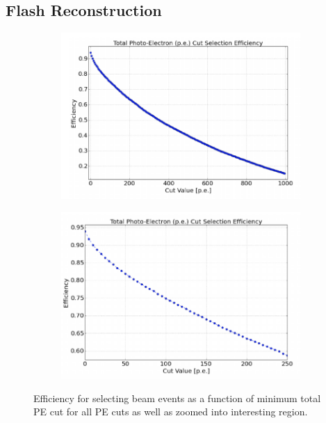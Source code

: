 \subsection{Flash Reconstruction}
\begin{figure}[htp!]
\centering
	\begin{subfigure}[b]{.6\textwidth}
	\includegraphics[width=\textwidth]{figs/totalpecut.png}
	\end{subfigure}
	\quad
	\begin{subfigure}[b]{.6\textwidth}
	\includegraphics[width=\textwidth]{figs/totalpe_zoomed.png}
	\end{subfigure}
	\quad
\caption{Efficiency for selecting beam events as a function of minimum total PE cut for all PE cuts as well as zoomed into interesting region.}
\label{fig:PE}
\end{figure}
